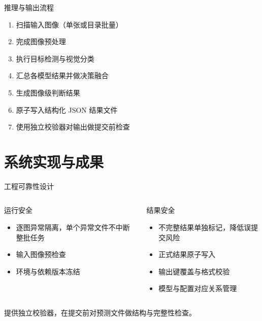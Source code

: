 \documentclass{beamer}
\begin{document}
\begin{frame}{推理与输出流程}
  \begin{enumerate}
    \item 扫描输入图像（单张或目录批量）
    \item 完成图像预处理
    \item 执行目标检测与视觉分类
    \item 汇总各模型结果并做决策融合
    \item 生成图像级判断结果
    \item 原子写入结构化 JSON 结果文件
    \item 使用独立校验器对输出做提交前检查
  \end{enumerate}
\end{frame}

\section{系统实现与成果}
\begin{frame}{工程可靠性设计}
  \begin{columns}[t]
      \begin{block}{运行安全}
        \small
        \begin{itemize}
          \item 逐图异常隔离，单个异常文件不中断整批任务
          \item 输入图像预检查
          \item 环境与依赖版本冻结
        \end{itemize}
      \end{block}
      \begin{block}{结果安全}
        \small
        \begin{itemize}
          \item 不完整结果单独标记，降低误提交风险
          \item 正式结果原子写入
          \item 输出键覆盖与格式校验
          \item 模型与配置对应关系管理
        \end{itemize}
      \end{block}
  \end{columns}
  \vspace{0.4em}
  \begin{center}
    \small 提供独立校验器，在提交前对预测文件做结构与完整性检查。
  \end{center}
\end{frame}
\end{document}
